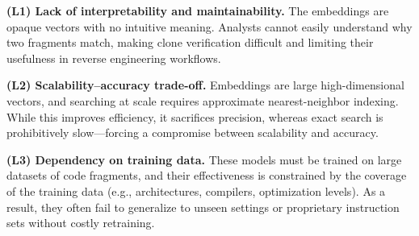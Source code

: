 \squishlist
\item 
\textbf{(L1) Lack of interpretability and maintainability.}
The embeddings are opaque vectors with no intuitive meaning. Analysts cannot easily understand why two fragments match, making clone verification difficult and limiting their usefulness in reverse engineering workflows.

\item 
\textbf{(L2) Scalability–accuracy trade-off.}
Embeddings are large high-dimensional vectors, and searching at scale requires approximate nearest-neighbor indexing. While this improves efficiency, it sacrifices precision, whereas exact search is prohibitively slow—forcing a compromise between scalability and accuracy.

\item 
\textbf{(L3) Dependency on training data.}
These models must be trained on large datasets of code fragments, and their effectiveness is constrained by the coverage of the training data (e.g., architectures, compilers, optimization levels). As a result, they often fail to generalize to unseen settings or proprietary instruction sets without costly retraining.
\squishlistend

